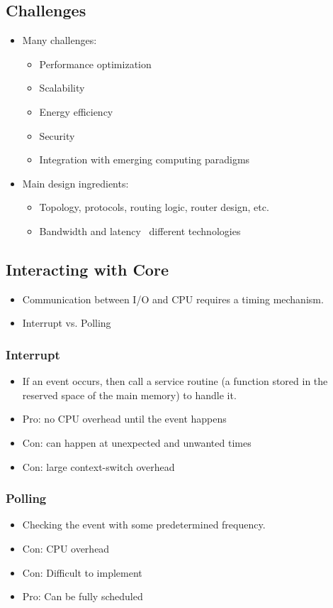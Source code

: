 \documentclass[10pt]{article}
\begin{document}
\subsection*{Challenges}
\begin{itemize}
    \item Many challenges:
    \begin{itemize}
        \item Performance optimization
        \item Scalability
        \item Energy efficiency
        \item Security
        \item Integration with emerging computing paradigms
    \end{itemize}
    \item Main design ingredients:
    \begin{itemize}
        \item Topology, protocols, routing logic, router design, etc.
        \item Bandwidth and latency \textrightarrow~different technologies
    \end{itemize}
\end{itemize}
\subsection*{Interacting with Core}
\begin{itemize}
    \item Communication between I/O and CPU requires a timing mechanism.
    \item Interrupt vs. Polling
\end{itemize}
\subsubsection*{Interrupt}
\begin{itemize}
    \item If an event occurs, then call a service routine (a function stored in the reserved space of the main memory) to handle it.
    \item Pro: no CPU overhead until the event happens
    \item Con: can happen at unexpected and unwanted times
    \item Con: large context-switch overhead
\end{itemize}
\subsubsection*{Polling}
\begin{itemize}
    \item Checking the event with some predetermined frequency.
    \item Con: CPU overhead
    \item Con: Difficult to implement
    \item Pro: Can be fully scheduled
\end{itemize}
\end{document}
